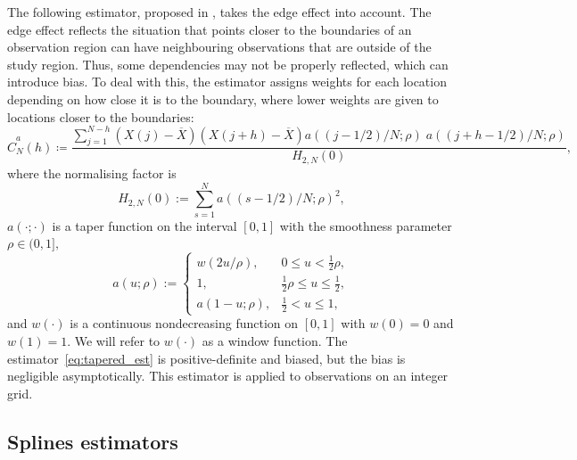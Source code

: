 The following estimator, proposed in \cite{Dahlhaus1987}, takes the edge
effect into account. The edge effect reflects the situation that points
closer to the boundaries of an observation region can have neighbouring
observations that are outside of the study region. Thus, some
dependencies may not be properly reflected, which can introduce bias. To
deal with this, the estimator assigns weights for each location
depending on how close it is to the boundary, where lower weights are
given to locations closer to the boundaries: \begin{equation}
 \label{eq:tapered_est}
        \widehat{C}^{a}_{N}(h) \coloneq \frac{\displaystyle \sum_{j = 1}^{N - h} \left( X(j) - \overline{X}\right) \left( X(j + h) - \overline{X} \right) a\left( (j - 1/2)/N; \rho \right) \; a \left( (j + h - 1/2)/N; \rho \right) }
        {\displaystyle H_{2, N}(0) },
\end{equation} where the normalising factor is
\[H_{2, N}(0) := \sum_{s=1}^{N} a ( (s - 1/2)/N; \rho )^{2} ,\]
\(a(\cdot; \cdot)\) is a taper function on the interval \([0, 1]\) with
the smoothness parameter \(\rho \in (0, 1],\) \[a(u; \rho) := 
\begin{cases}
        w(2u/\rho) ,& 0 \leq u < \frac{1}{2}\rho, \\
        1 ,& \frac{1}{2} \rho \leq u \leq \frac{1}{2}, \\
        a(1-u; \rho) ,& \frac{1}{2} < u \leq 1,
\end{cases}\] and \(w(\cdot)\) is a continuous nondecreasing function on
\([0, 1]\) with \(w(0)=0\) and \(w(1)=1.\) We will refer to \(w(\cdot)\)
as a window function. The estimator~\eqref{eq:tapered_est} is
positive-definite and biased, but the bias is negligible asymptotically.
This estimator is applied to observations on an integer grid.

\subsection{Splines estimators}\label{splines-estimators}

